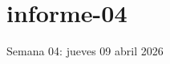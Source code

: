 \documentclass[./informes.tex]{subfiles}
\begin{document}
\chapter{informe-04}

Semana 04: jueves 09 abril 2026






\printbibliography[
  heading=subbibliography
]
\end{document}
